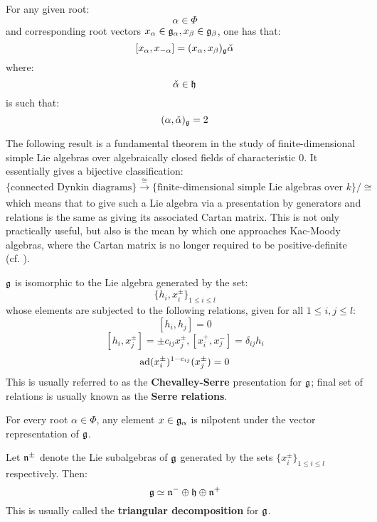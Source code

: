         \begin{corollary}
            For any given root:
                $$\alpha \in \Phi$$
            and corresponding root vectors $x_{\alpha} \in \mathfrak{g}_{\alpha}, x_{\beta} \in \mathfrak{g}_{\beta}$, one has that:
                $$[x_{\alpha}, x_{-\alpha}] = (x_{\alpha}, x_{\beta})_{\mathfrak{g}} \check{\alpha}$$
            where:
                $$\check{\alpha} \in \mathfrak{h}$$
            is such that:
                $$(\alpha, \check{\alpha})_{\mathfrak{g}} = 2$$
        \end{corollary}
        The following result is a fundamental theorem in the study of finite-dimensional simple Lie algebras over algebraically closed fields of characteristic $0$. It essentially gives a bijective classification:
            $$\{ \text{connected Dynkin diagrams} \} \xrightarrow[]{\cong} \{ \text{finite-dimensional simple Lie algebras over $k$} \}/\cong$$
        which means that to give such a Lie algebra via a presentation by generators and relations is the same as giving its associated Cartan matrix. This is not only practically useful, but also is the mean by which one approaches Kac-Moody algebras, where the Cartan matrix is no longer required to be positive-definite (cf. \cite[Chapters 1-5]{kac_infinite_dimensional_lie_algebras}). 
        \begin{theorem}
            $\mathfrak{g}$ is isomorphic to the Lie algebra generated by the set:
                $$\{h_i, x_i^{\pm}\}_{1 \leq i \leq l}$$
            whose elements are subjected to the following relations, given for all $1 \leq i, j \leq l$:
                $$[h_i, h_j] = 0$$
                $$[h_i, x_j^{\pm}] = \pm c_{ij} x_j^{\pm}, [x_i^+, x_j^-] = \delta_{ij} h_i$$
                $$\mathrm{ad}(x_i^{\pm})^{1 - c_{ij}}(x_j^{\pm}) = 0$$
            This is usually referred to as the \textbf{Chevalley-Serre} presentation for $\mathfrak{g}$; final set of relations is usually known as the \textbf{Serre relations}.
        \end{theorem}
        \begin{corollary}
            For every root $\alpha \in \Phi$, any element $x \in \mathfrak{g}_{\alpha}$ is nilpotent under the vector representation of $\mathfrak{g}$. 
        \end{corollary}
        \begin{corollary}
            Let $\mathfrak{n}^{\pm}$ denote the Lie subalgebras of $\mathfrak{g}$ generated by the sets $\{x_i^{\pm}\}_{1 \leq i \leq l}$ respectively. Then:
                $$\mathfrak{g} \simeq \mathfrak{n}^- \oplus \mathfrak{h} \oplus \mathfrak{n}^+$$
            This is usually called the \textbf{triangular decomposition} for $\mathfrak{g}$. 
        \end{corollary}

